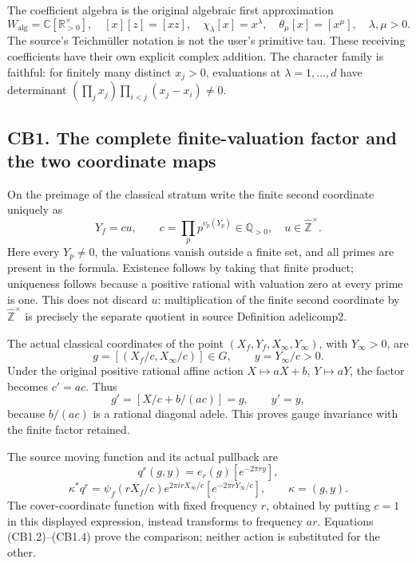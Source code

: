The coefficient algebra is the original algebraic first approximation \[
W_{\mathrm{alg}}=\mathbb C[\mathbb R_{>0}^{\times}],\quad
[x][z]=[xz],\quad
\chi_\lambda[x]=x^\lambda,\quad
\theta_\mu[x]=[x^\mu],\quad \lambda,\mu>0.
\] The source's Teichmüller notation is not the user's primitive tau.
These receiving coefficients have their own explicit complex addition.
The character family is faithful: for finitely many distinct \(x_j>0\),
evaluations at \(\lambda=1,\ldots,d\) have determinant
\((\prod_jx_j)\prod_{i<j}(x_j-x_i)\ne0\).

\subsection{CB1. The complete finite-valuation factor and the two
coordinate
maps}\label{cb1.-the-complete-finite-valuation-factor-and-the-two-coordinate-maps}

On the preimage of the classical stratum write the finite second
coordinate uniquely as \[
Y_f=c u,\qquad
c=\prod_p p^{v_p(Y_p)}\in\mathbb Q_{>0},\quad
u\in\widehat{\mathbb Z}^{\times}.
\tag{CB1.1}
\] Here every \(Y_p\ne0\), the valuations vanish outside a finite set,
and all primes are present in the formula. Existence follows by taking
that finite product; uniqueness follows because a positive rational with
valuation zero at every prime is one. This does not discard \(u\):
multiplication of the finite second coordinate by
\(\widehat{\mathbb Z}^{\times}\) is precisely the separate quotient in
source Definition adelicomp2.

The actual classical coordinates of the point
\((X_f,Y_f,X_\infty,Y_\infty)\), with \(Y_\infty>0\), are \[
g=[(X_f/c,X_\infty/c)]\in G,\qquad y=Y_\infty/c>0.
\tag{CB1.2}
\] Under the original positive rational affine action \(X\mapsto aX+b\),
\(Y\mapsto aY\), the factor becomes \(c'=ac\). Thus \[
g'=[X/c+b/(ac)]=g,\qquad y'=y,
\tag{CB1.3}
\] because \(b/(ac)\) is a rational diagonal adele. This proves gauge
invariance with the finite factor retained.

The source moving function and its actual pullback are \[
q^r(g,y)=e_r(g)[e^{-2\pi r y}],
\] \[
\kappa^*q^r
=\psi_f(rX_f/c)e^{2\pi irX_\infty/c}
  [e^{-2\pi rY_\infty/c}],\qquad \kappa=(g,y).
\tag{CB1.4}
\] The cover-coordinate function with fixed frequency \(r\), obtained by
putting \(c=1\) in this displayed expression, instead transforms to
frequency \(ar\). Equations (CB1.2)--(CB1.4) prove the comparison;
neither action is substituted for the other.

